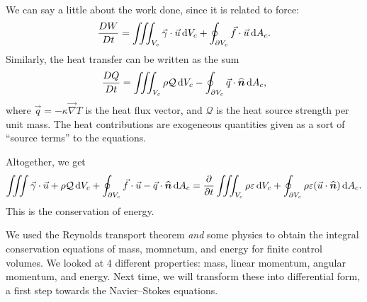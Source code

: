 \begin{node}
\begin{subequations}
\begin{align}
  \end{align}
\end{subequations}
We can say a little about the work done, since it is related to force:
\begin{equation}
\frac{D W}{D t} = \iiint_{V_{c}}\vec{\gamma}\cdot\vec{u}\,\mathrm{d} V_{c}
+\oint_{\partial V_{c}}\vec{f}\cdot\vec{u}\,\mathrm{d} A_{c}.
\end{equation}
Similarly, the heat transfer can be written as the sum
\begin{equation}
\frac{D Q}{D t} = \iiint_{V_{c}}\rho \mathcal{Q}\,\mathrm{d} V_{c}
-\oint_{\partial V_{c}}\vec{q}\cdot\widehat{\boldsymbol{n}}\,\mathrm{d} A_{c},
\end{equation}
where $\vec{q}=-\kappa\vec{\nabla}T$ is the heat flux vector, and
$\mathcal{Q}$ is the heat source strength per unit mass.
The heat contributions are exogeneous quantities given as a sort of
``source terms'' to the equations.

Altogether, we get
\begin{equation}
\iiint\vec{\gamma}\cdot\vec{u}+\rho\mathcal{Q}\,\mathrm{d} V_{c}
+\oint_{\partial V_{c}}\vec{f}\cdot\vec{u}-\vec{q}\cdot\widehat{\boldsymbol{n}}\,\mathrm{d} A_{c}
=\frac{\partial}{\partial t}\iiint_{V_{c}}\rho\varepsilon\,\mathrm{d} V_{c}
+\oint_{\partial V_{c}}\rho\varepsilon(\vec{u}\cdot\widehat{\boldsymbol{n}})\,\mathrm{d} A_{c}.
\end{equation}
This is the conservation of energy.
\end{node}

\begin{node}[Recap]
We used the Reynolds transport theorem \emph{and} some physics to
obtain the integral conservation equations of mass, momnetum, and
energy for finite control volumes. We looked at 4 different
properties: mass, linear momentum, angular momentum, and energy. Next
time, we will transform these into differential form, a first step
towards the Navier--Stokes equations.
\end{node}